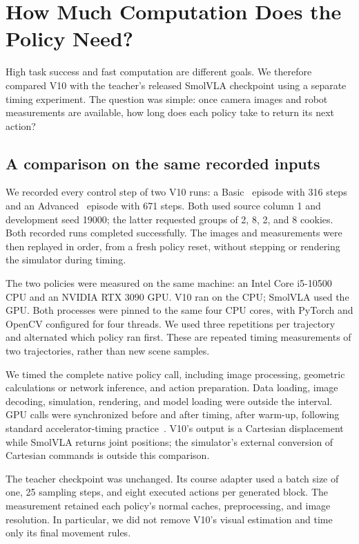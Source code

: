 \section{How Much Computation Does the Policy Need?}
\label{sec:latency}
High task success and fast computation are different goals. We therefore compared V10 with the teacher's released SmolVLA checkpoint using a separate timing experiment. The question was simple: once camera images and robot measurements are available, how long does each policy take to return its next action?

\subsection{A comparison on the same recorded inputs}
We recorded every control step of two V10 runs: a Basic \pFive\ episode with 316 steps and an Advanced \pTen\ episode with 671 steps. Both used source column 1 and development seed 19000; the latter requested groups of 2, 8, 2, and 8 cookies. Both recorded runs completed successfully. The images and measurements were then replayed in order, from a fresh policy reset, without stepping or rendering the simulator during timing.

The two policies were measured on the same machine: an Intel Core i5-10500 CPU and an NVIDIA RTX 3090 GPU. V10 ran on the CPU; SmolVLA used the GPU. Both processes were pinned to the same four CPU cores, with PyTorch and OpenCV configured for four threads. We used three repetitions per trajectory and alternated which policy ran first. These are repeated timing measurements of two trajectories, rather than new scene samples.

We timed the complete native policy call, including image processing, geometric calculations or network inference, and action preparation. Data loading, image decoding, simulation, rendering, and model loading were outside the interval. GPU calls were synchronized before and after timing, after warm-up, following standard accelerator-timing practice~\cite{torchbench}. V10's output is a Cartesian displacement while SmolVLA returns joint positions; the simulator's external conversion of Cartesian commands is outside this comparison.

The teacher checkpoint was unchanged. Its course adapter used a batch size of one, 25 sampling steps, and eight executed actions per generated block. The measurement retained each policy's normal caches, preprocessing, and image resolution. In particular, we did not remove V10's visual estimation and time only its final movement rules.

